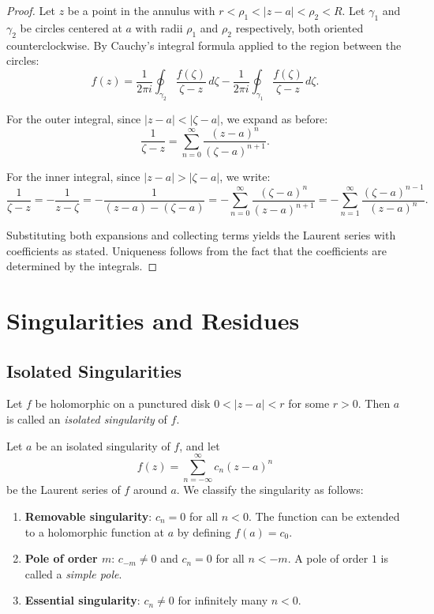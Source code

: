 \begin{proof}
  Let $z$ be a point in the annulus with $r < \rho_1 < |z - a| < \rho_2 < R$.
  Let $\gamma_1$ and $\gamma_2$ be circles centered at $a$ with radii $\rho_1$ and $\rho_2$ respectively, both oriented counterclockwise.
  By Cauchy's integral formula applied to the region between the circles:
  \[
    f(z) = \frac{1}{2\pi i} \oint_{\gamma_2} \frac{f(\zeta)}{\zeta - z} \, d\zeta - \frac{1}{2\pi i} \oint_{\gamma_1} \frac{f(\zeta)}{\zeta - z} \, d\zeta.
  \]

  For the outer integral, since $|z - a| < |\zeta - a|$, we expand as before:
  \[
    \frac{1}{\zeta - z} = \sum_{n=0}^{\infty} \frac{(z - a)^n}{(\zeta - a)^{n+1}}.
  \]

  For the inner integral, since $|z - a| > |\zeta - a|$, we write:
  \[
    \frac{1}{\zeta - z} = -\frac{1}{z - \zeta} = -\frac{1}{(z - a) - (\zeta - a)} = -\sum_{n=0}^{\infty} \frac{(\zeta - a)^n}{(z - a)^{n+1}} = -\sum_{n=1}^{\infty} \frac{(\zeta - a)^{n-1}}{(z - a)^n}.
  \]

  Substituting both expansions and collecting terms yields the Laurent series with coefficients as stated.
  Uniqueness follows from the fact that the coefficients are determined by the integrals.
\end{proof}

\chapter{Singularities and Residues}

\section{Isolated Singularities}

\begin{definition}
  Let $f$ be holomorphic on a punctured disk $0 < |z - a| < r$ for some $r > 0$.
  Then $a$ is called an \emph{isolated singularity} of $f$.
\end{definition}

\begin{definition}
  Let $a$ be an isolated singularity of $f$, and let
  \[
    f(z) = \sum_{n=-\infty}^{\infty} c_n (z - a)^n
  \]
  be the Laurent series of $f$ around $a$. We classify the singularity as follows:
  \begin{enumerate}
    \item \textbf{Removable singularity}: $c_n = 0$ for all $n < 0$. The function can be extended to a holomorphic function at $a$ by defining $f(a) = c_0$.
    \item \textbf{Pole of order $m$}: $c_{-m} \neq 0$ and $c_n = 0$ for all $n < -m$. A pole of order $1$ is called a \emph{simple pole}.
    \item \textbf{Essential singularity}: $c_n \neq 0$ for infinitely many $n < 0$.
  \end{enumerate}
\end{definition}

